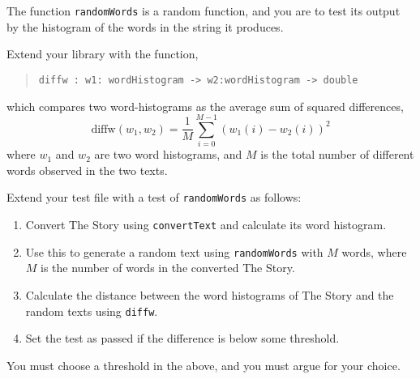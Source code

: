The function \lstinline{randomWords} is a random function, and you are
to test its output by the histogram of the words in the string it
produces.

Extend your library with the function,
\begin{quote}
  \mbox{\lstinline!diffw : w1: wordHistogram -> w2:wordHistogram -> double!}
\end{quote}
which compares two word-histograms as the average sum of squared differences,
\begin{equation}
  \text{diffw}(w_1, w_2) = \frac{1}{M}\sum_{i=0}^{M-1}\left(w_1(i) - w_2(i)\right)^2
\end{equation}
where $w_1$ and $w_2$ are two word histograms, and $M$ is the total
number of different words observed in the two texts.

Extend your test file with a test of \lstinline{randomWords}
as follows:
\begin{enumerate}
\item Convert The Story using \lstinline{convertText} and calculate
  its word histogram.
\item Use this to generate a random text using \lstinline{randomWords} with
  $M$ words, where $M$ is the number of words in the converted The Story.
\item Calculate the distance between the word histograms of The Story
  and the random texts using \lstinline{diffw}.
\item Set the test as passed if the difference is below some threshold.
\end{enumerate}
You must choose a threshold in the above, and you must argue for your choice.
